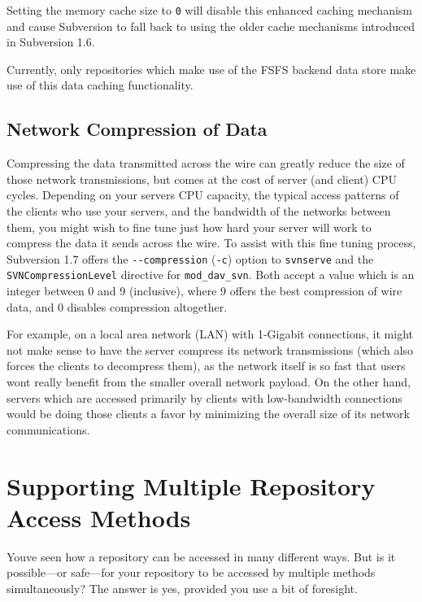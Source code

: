 Setting the memory cache size to \texttt{0} will disable this enhanced
caching mechanism and cause Subversion to fall back to using the older
cache mechanisms introduced in Subversion 1.6.

Currently, only repositories which make use of the FSFS backend data
store make use of this data caching functionality.

\subsection{Network Compression of
Data}\label{svn.serverconfig.optimization.compression}

Compressing the data transmitted across the wire can greatly reduce the
size of those network transmissions, but comes at the cost of server
(and client) CPU cycles. Depending on your server\textquotesingle s CPU
capacity, the typical access patterns of the clients who use your
servers, and the bandwidth of the networks between them, you might wish
to fine tune just how hard your server will work to compress the data it
sends across the wire. To assist with this fine tuning process,
Subversion 1.7 offers the \texttt{-\/-compression} (\texttt{-c}) option
to \texttt{svnserve} and the \texttt{SVNCompressionLevel} directive for
\texttt{mod\_dav\_svn}. Both accept a value which is an integer between
0 and 9 (inclusive), where 9 offers the best compression of wire data,
and 0 disables compression altogether.

For example, on a local area network (LAN) with 1-Gigabit connections,
it might not make sense to have the server compress its network
transmissions (which also forces the clients to decompress them), as the
network itself is so fast that users won\textquotesingle t really
benefit from the smaller overall network payload. On the other hand,
servers which are accessed primarily by clients with low-bandwidth
connections would be doing those clients a favor by minimizing the
overall size of its network communications.

\section{Supporting Multiple Repository Access
Methods}\label{svn.serverconfig.multimethod}

You\textquotesingle ve seen how a repository can be accessed in many
different ways. But is it possible---or safe---for your repository to be
accessed by multiple methods simultaneously? The answer is yes, provided
you use a bit of foresight.

